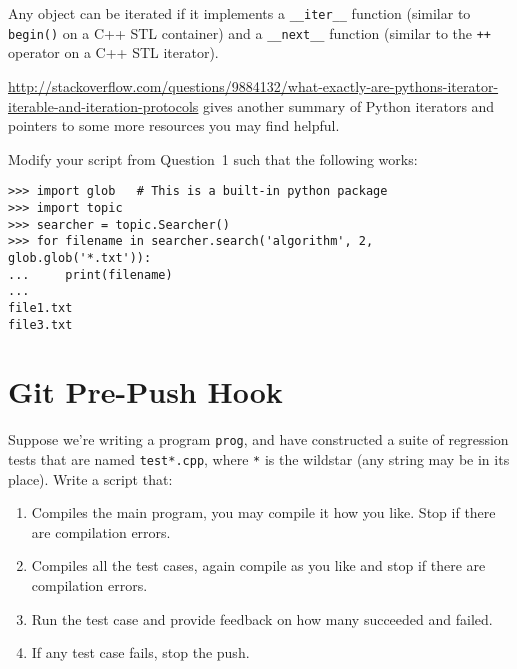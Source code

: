 \documentclass{article}
\begin{document}
\medskip
\noindent
Any object can be iterated if it implements a \texttt{\_\_iter\_\_} function
(similar to \texttt{begin()} on a C++ STL container) and a \texttt{\_\_next\_\_}
function (similar to the \texttt{++} operator on a C++ STL iterator).

\medskip
\noindent
\url{http://stackoverflow.com/questions/9884132/what-exactly-are-pythons-iterator-iterable-and-iteration-protocols}
gives another summary of Python iterators and pointers to some more resources
you may find helpful.


\vspace{3cm}
\noindent
Modify your script from Question~1 such that the following works:
\begin{lstlisting}
>>> import glob   # This is a built-in python package
>>> import topic
>>> searcher = topic.Searcher()
>>> for filename in searcher.search('algorithm', 2, glob.glob('*.txt')):
...     print(filename)
...
file1.txt
file3.txt
\end{lstlisting}

\newpage
\section{Git Pre-Push Hook}
Suppose we're writing a program \lstinline{prog}, and have constructed a suite of regression tests that are named \lstinline{test*.cpp}, where \lstinline{*} is the wildstar (any string may be in its place). Write a script that:
\begin{enumerate}
    \item Compiles the main program, you may compile it how you like. Stop if there are compilation errors.
    \item Compiles all the test cases, again compile as you like and stop if there are compilation errors. 
    \item Run the test case and provide feedback on how many succeeded and failed. 
    \item If any test case fails, stop the push. 
\end{enumerate}
\vspace{5cm}
\end{document}
